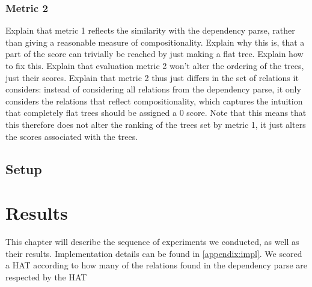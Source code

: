 \documentclass{report}
\theoremstyle{definition}
\theoremstyle{plain}
\begin{document}
\subsection{Metric 2}

Explain that metric 1 reflects the similarity with the dependency parse, rather than giving a reasonable measure of compositionality. Explain why this is, that a part of the score can trivially be reached by just making a flat tree. Explain how to fix this. Explain that evaluation metric 2 won't alter the ordering of the trees, just their scores.
Explain that metric 2 thus just differs in the set of relations it considers: instead of considering all relations from the dependency parse, it only considers the relations that reflect compositionality, which captures the intuition that completely flat trees should be assigned a 0 score. Note that this means that this therefore does not alter the ranking of the trees set by metric 1, it just alters the scores associated with the trees.





\section{Setup}







%
%


\chapter{Results}

This chapter will describe the sequence of experiments we conducted, as well as their results. Implementation details can be found in \ref{appendix:impl}. 
We scored a HAT according to how many of the relations found in the dependency parse are respected by the HAT



\end{document}
